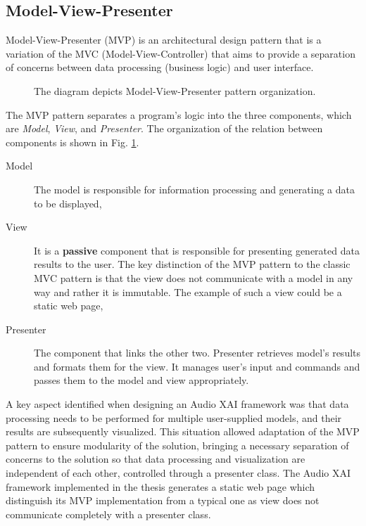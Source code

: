\documentclass[
    bindingoffset=5mm,  %
    footnoteindent=3mm, %
    hyphenation=true    %
]{src/wut-thesis}
\begin{document}
\subsection{Model-View-Presenter} \label{ch2:ModelViewController}

Model-View-Presenter (MVP) \cite{Potel2011} is an architectural design pattern that is a variation
of the MVC (Model-View-Controller) that aims to provide a separation of concerns between
data processing (business logic) and user interface.

\begin{figure}[h!] %
    \centering
    
    \caption{The diagram depicts Model-View-Presenter pattern organization.}
    \label{fig:MvpDiagram}
\end{figure}

The MVP pattern separates a program’s logic into the three components, which are
\emph{Model}, \emph{View}, and \emph{Presenter}. The organization of the relation
between components is shown in Fig. \ref{fig:MvpDiagram}.

\begin{description}
    \item[Model] The model is responsible for information processing and
        generating a data to be displayed,
    \item[View] It is a \textbf{passive} component that is responsible for presenting 
        generated data results to the user. The key distinction of the MVP pattern
        to the classic MVC pattern is that the view does not communicate with a
        model in any way and rather it is immutable. The example of such a view
        could be a static web page,
    \item[Presenter] The component that links the other two. Presenter retrieves model's
        results and formats them for the view.
        It manages user's input and commands and passes them to the model and view appropriately.
\end{description}

A key aspect identified when designing an Audio XAI framework was that data processing needs
to be performed for multiple user-supplied models, and their results are subsequently visualized.
This situation allowed adaptation of the MVP pattern to ensure modularity of the solution,
bringing a necessary separation of concerns to the solution so that data processing and
visualization are independent of each other, controlled through a presenter class.
The Audio XAI framework implemented in the thesis generates a static web page which
distinguish its MVP implementation from a typical one as view does not communicate completely
with a presenter class.
\end{document}
